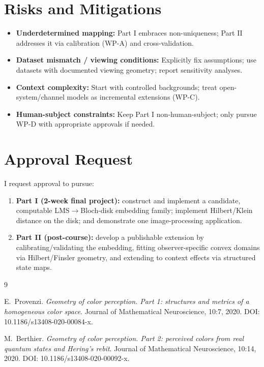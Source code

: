 \documentclass[11pt]{article}
\begin{document}
\section{Risks and Mitigations}
\begin{itemize}[leftmargin=2.2em]
\item \textbf{Underdetermined mapping:} Part I embraces non-uniqueness; Part II addresses it via calibration (WP-A) and cross-validation.
\item \textbf{Dataset mismatch / viewing conditions:} Explicitly fix assumptions; use datasets with documented viewing geometry; report sensitivity analyses.
\item \textbf{Context complexity:} Start with controlled backgrounds; treat open-system/channel models as incremental extensions (WP-C).
\item \textbf{Human-subject constraints:} Keep Part I non-human-subject; only pursue WP-D with appropriate approvals if needed.
\end{itemize}

\section*{Approval Request}
I request approval to pursue:
\begin{enumerate}[leftmargin=2.2em]
\item \textbf{Part I (2-week final project):} construct and implement a candidate, computable LMS$\to$Bloch-disk embedding family; implement Hilbert/Klein distance on the disk; and demonstrate one image-processing application.
\item \textbf{Part II (post-course):} develop a publishable extension by calibrating/validating the embedding, fitting observer-specific convex domains via Hilbert/Finsler geometry, and extending to context effects via structured state maps.
\end{enumerate}

\vspace{0.5em}

\begin{thebibliography}{9}

E.~Provenzi.
\newblock \emph{Geometry of color perception. Part 1: structures and metrics of a homogeneous color space}.
\newblock Journal of Mathematical Neuroscience, 10:7, 2020.
\newblock DOI: 10.1186/s13408-020-00084-x.

M.~Berthier.
\newblock \emph{Geometry of color perception. Part 2: perceived colors from real quantum states and Hering's rebit}.
\newblock Journal of Mathematical Neuroscience, 10:14, 2020.
\newblock DOI: 10.1186/s13408-020-00092-x.

\end{thebibliography}
\end{document}
